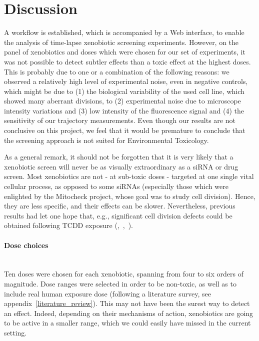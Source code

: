 \section{Discussion}

A workflow is established, which is accompanied by a Web interface, to
enable the analysis of time-lapse xenobiotic screening
experiments. However, on the panel of xenobiotics and doses which were
chosen for our set of experiments, it was not possible to detect
subtler effects than a toxic effect at the highest doses.
This is
probably due to one or a combination of the following reasons: we observed a
relatively high level of experimental noise, even in negative
controls, which might be due to (1) the biological variability of the used
cell line, which showed many aberrant divisions, to (2) experimental noise due to microscope intensity
variations and (3) low intensity of the fluorescence signal and (4) the sensitivity of our
trajectory measurements. Even though our results are not conclusive on
this project, we feel that it would be premature to conclude that the screening approach
is not suited for Environmental Toxicology. 

As a general remark, it should not be forgotten that it is very likely that a xenobiotic screen will never be as visually extraordinary as a siRNA or drug screen. Most xenobiotics are not - at sub-toxic doses - targeted at one single vital cellular process, as opposed to some siRNAs (especially those which were enlighted by the Mitocheck project, whose goal was to study cell division). Hence, they are less specific, and their effects can be slower. Nevertheless, previous results had let one hope that, e.g., significant cell division defects could be obtained following TCDD exposure (\cite{pmid20089886},~\cite{pmid18640100},~\cite{pmid11479202}).

\paragraph*{Dose choices}~\\
Ten doses were chosen for each xenobiotic, spanning from four to six orders of magnitude. Dose ranges were selected in order to be non-toxic, as well as to include real human exposure dose (following a literature survey, see appendix~\ref{literature_review}). This may not have been the surest way to detect an effect. Indeed, depending on their mechanisms of action, xenobiotics are going to be active in a smaller range, which we could easily have missed in the current setting.

